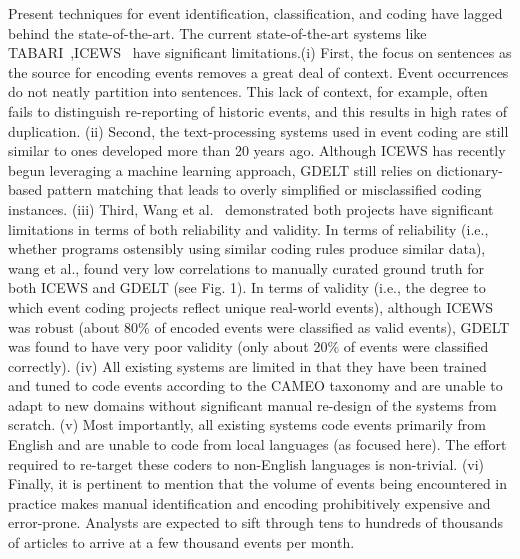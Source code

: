 






Present techniques for event identification, classification, and coding have lagged behind the state-of-the-art. The current state-of-the-art systems like TABARI~\cite{schrodt2009tabari},ICEWS~\cite{boschee2015icews} have significant limitations.(i) First, the focus on sentences as the source for encoding events removes a great deal of context. Event occurrences do not neatly partition into sentences. This lack of context, for example, often fails to distinguish re-reporting of historic events, and this results in high rates of duplication. (ii) Second, the text-processing systems used in event coding are still similar  to  ones  developed  more  than  20  years  ago. Although ICEWS has recently begun leveraging a  machine learning  approach,  GDELT  still  relies on  dictionary-based  pattern  matching  that leads  to  overly  simplified  or  misclassified coding  instances. (iii) Third, Wang et al.~\cite{wang2016growing} demonstrated both projects have significant limitations in terms of both reliability and validity. In terms of reliability (i.e., whether programs ostensibly using similar coding rules produce similar data), wang et al., found very low correlations to manually curated ground truth for both ICEWS and GDELT (see Fig. 1). In terms of validity (i.e., the degree to which event coding   projects   reflect   unique   real-world events), although ICEWS was robust (about 80\% of encoded events were classified as valid  events), GDELT was found to have very poor validity (only about 20\% of events were classified correctly). (iv) All existing systems are limited in that they have been trained and tuned to code events according to the CAMEO taxonomy and are unable to adapt to new domains without significant manual re-design of the systems from scratch. (v) Most importantly, all existing systems code events primarily from English and are unable to code from local languages (as focused here). The effort required to re-target these coders to non-English languages is non-trivial. (vi) Finally, it is pertinent to mention that the volume of events being encountered in practice makes manual identification and encoding prohibitively expensive and error-prone. Analysts are expected to sift through tens to hundreds of thousands of articles to arrive at a few thousand events per month.

